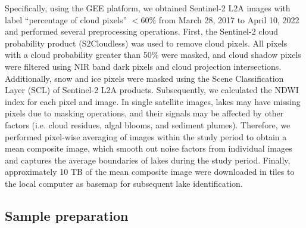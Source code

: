 \documentclass[preprint,12pt,authoryear]{elsarticle}
\begin{document}
Specifically, using the GEE platform, we obtained Sentinel-2 L2A images with label “percentage of cloud pixels” $\lt60\%$ from March 28, 2017 to April 10, 2022 and performed several preprocessing operations. First, the Sentinel-2 cloud probability product (S2Cloudless) was used to remove cloud pixels. All pixels with a cloud probability greater than 50\% were masked, and cloud shadow pixels were filtered using NIR band dark pixels and cloud projection intersections. Additionally, snow and ice pixels were masked using the Scene Classification Layer (SCL) of Sentinel-2 L2A products. Subsequently, we calculated the NDWI index for each pixel and image. In single satellite images, lakes may have missing pixels due to masking operations, and their signals may be affected by other factors (i.e. cloud residues, algal blooms, and sediment plumes). Therefore, we performed pixel-wise averaging of images within the study period to obtain a mean composite image, which smooth out noise factors from individual images and captures the average boundaries of lakes during the study period. Finally, approximately 10 TB of the mean composite image were downloaded in tiles to the local computer as basemap for subsequent lake identification.

\subsection{Sample preparation}
\label{subsec2}
\end{document}
